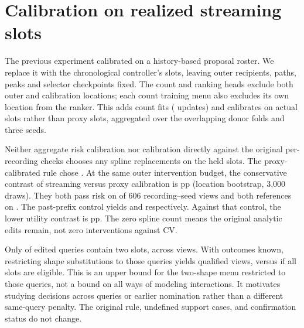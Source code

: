 \section{Calibration on realized streaming slots}
The previous experiment calibrated on a history-based proposal
roster. We replace it with the chronological controller's slots,
leaving outer recipients, paths, peaks and selector checkpoints fixed.
The count and ranking heads exclude both outer and calibration
locations; each count training menu also excludes its own location
from the ranker. This adds \StreamSplineFits{} count fits
(\StreamSplineUpdates{} updates) and calibrates on \StreamSplineActual{}
actual slots rather than \StreamSplineProxy{} proxy slots, aggregated
over the overlapping donor folds and three seeds.

Neither aggregate risk calibration nor calibration directly against
the original per-recording checks chooses any spline replacements
on the held slots. The proxy-calibrated rule chose \StreamSplinePriorChoices{}.
At the same outer intervention budget, the conservative contrast
of streaming versus proxy calibration is \StreamSplinePrimary{} pp
(location bootstrap, 3,000 draws). They both pass risk on
\StreamSplineJointRisk{} of 606 recording--seed views and both references
on \StreamSplineJointDual{}. The past-prefix control yields
\StreamSplinePrefixRisk{} and \StreamSplinePrefixDual{} respectively.
Against that control, the lower utility contrast is
\StreamSplineAgainstPrefix{} pp. The zero spline count means the
original analytic edits remain, not zero interventions against CV.

Only \StreamSplineDoubleQueries{} of \StreamSplineActiveQueries{} edited
queries contain two slots, across \StreamSplineDoubleViews{} views.
With outcomes known, restricting shape substitutions to those
queries yields \StreamSplineRestricted{} qualified views, versus
\StreamSplineAll{} if all slots are eligible. This is an upper bound
for the two-shape menu restricted to those queries, not a bound on
all ways of modeling interactions. It motivates studying decisions
across queries or earlier nomination rather than a different
same-query penalty. The original rule, undefined support cases, and
confirmation status do not change.
